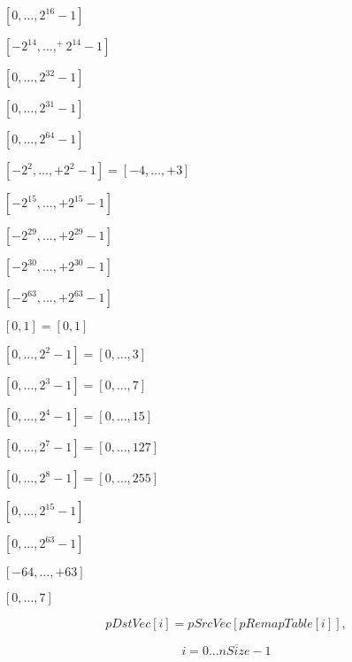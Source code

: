 \documentclass{article}
\begin{document}
$[0,\ldots,2^{16}-1]$
\pagebreak

$[-2^{14},\ldots,^+2^{14}-1]$
\pagebreak

$[0,\ldots,2^{32}-1]$
\pagebreak

$[0,\ldots,2^{31}-1]$
\pagebreak

$[0,\ldots,2^{64}-1]$
\pagebreak

$[-2^2,\ldots,+2^2-1]=[-4,\ldots,+3]$
\pagebreak

$[-2^{15},\ldots,+2^{15}-1]$
\pagebreak

$[-2^{29},\ldots,+2^{29}-1]$
\pagebreak

$[-2^{30},\ldots,+2^{30}-1]$
\pagebreak

$[-2^{63},\ldots,+2^{63}-1]$
\pagebreak

$[0,1]=[0,1]$
\pagebreak

$[0,\ldots,2^2-1]=[0,\ldots,3]$
\pagebreak

$[0,\ldots,2^3-1]=[0,\ldots,7]$
\pagebreak

$[0,\ldots,2^4-1]=[0,\ldots,15]$
\pagebreak

$[0,\ldots,2^7-1]=[0,\ldots,127]$
\pagebreak

$[0,\ldots,2^8-1]=[0,\ldots,255]$
\pagebreak

$[0,\ldots,2^{15}-1]$
\pagebreak

$[0,\ldots,2^{63}-1]$
\pagebreak

$[-64,\ldots,+63]$
\pagebreak

$[0,\ldots,7]$
\pagebreak

\[
    pDstVec[i]=pSrcVec[pRemapTable[i]],
\]
\pagebreak

\[ i = \overline{0 \ldots nSize-1} \]
\pagebreak
\end{document}
